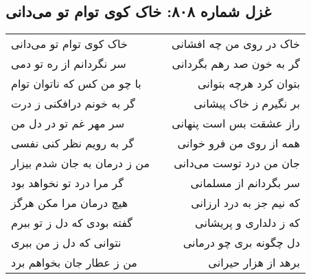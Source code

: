\begin{center}
\section*{غزل شماره ۸۰۸: خاک کوی توام تو می‌دانی}
\label{sec:808}
\begin{longtable}{l p{0.5cm} r}
خاک کوی توام تو می‌دانی
&&
خاک در روی من چه افشانی
\\
سر نگردانم از ره تو دمی
&&
گر به خون صد رهم بگردانی
\\
با چو من کس که ناتوان توام
&&
بتوان کرد هرچه بتوانی
\\
گر به خونم درافکنی ز درت
&&
بر نگیرم ز خاک پیشانی
\\
سر مهر غم تو در دل من
&&
راز عشقت بس است پنهانی
\\
گر به رویم نظر کنی نفسی
&&
همه از روی من فرو خوانی
\\
من ز درمان به جان شدم بیزار
&&
جان من درد توست می‌دانی
\\
گر مرا درد تو نخواهد بود
&&
سر بگردانم از مسلمانی
\\
هیچ درمان مرا مکن هرگز
&&
که نیم جز به درد ارزانی
\\
گفته بودی که دل ز تو ببرم
&&
که ز دلداری و پریشانی
\\
نتوانی که دل ز من ببری
&&
دل چگونه بری چو درمانی
\\
من ز عطار جان بخواهم برد
&&
برهد از هزار حیرانی
\\
\end{longtable}
\end{center}

